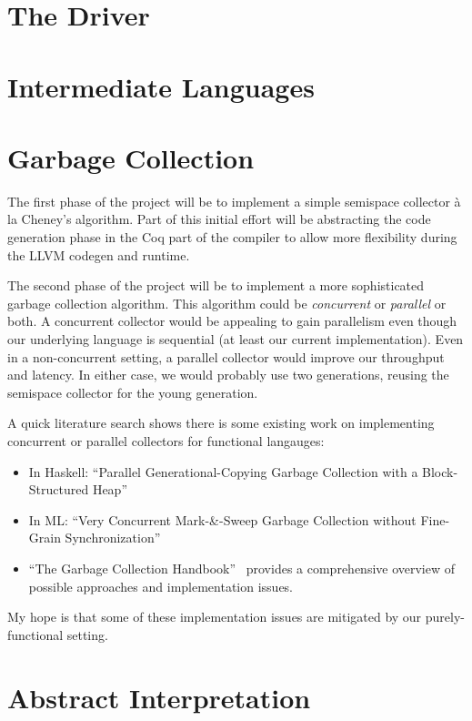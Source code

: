 \documentclass{article}
\begin{document}
\section{The Driver}
\label{sec:driver}

\section{Intermediate Languages}
\label{sec:il}

\section{Garbage Collection}
\label{sec:gc}

The first phase of the project will be to implement a simple semispace collector \`a la Cheney's algorithm. Part of this initial effort will be abstracting the code generation phase in the Coq part of the compiler to allow more flexibility during the LLVM codegen and runtime.

The second phase of the project will be to implement a more sophisticated garbage collection algorithm. This algorithm could be \emph{concurrent} or \emph{parallel} or both. A concurrent collector would be appealing to gain parallelism even though our underlying language is sequential (at least our current implementation). Even in a non-concurrent setting, a parallel collector would improve our throughput and latency. In either case, we would probably use two generations, reusing the semispace collector for the young generation.

A quick literature search shows there is some existing work on implementing concurrent or parallel collectors for functional langauges:
\begin{itemize}
\item In Haskell: ``Parallel Generational-Copying Garbage Collection with a Block-Structured Heap''~\cite{marlow:parallel}
\item In ML: ``Very Concurrent Mark-\&-Sweep Garbage Collection without Fine-Grain Synchronization''~\cite{Huelsbergen}
\item ``The Garbage Collection Handbook''~\cite{gcbook} provides a comprehensive overview of possible approaches and implementation issues.
\end{itemize}

My hope is that some of these implementation issues are mitigated by our purely-functional setting.


\section{Abstract Interpretation}
\label{sec:abstract-interp}
\end{document}
